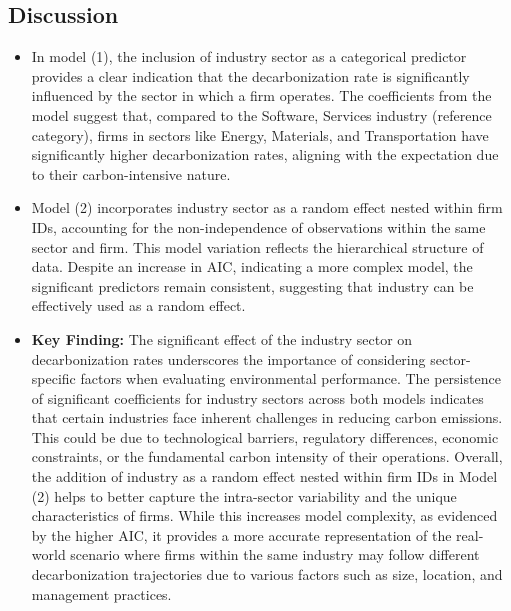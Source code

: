 \subsection{Discussion}
\begin{itemize}
    \item In model (1), the inclusion of industry sector as a categorical predictor provides a clear indication that the decarbonization rate is significantly influenced by the sector in which a firm operates. The coefficients from the model suggest that, compared to the Software, Services industry (reference category), firms in sectors like Energy, Materials, and Transportation have significantly higher decarbonization rates, aligning with the expectation due to their carbon-intensive nature.
    \item Model (2) incorporates industry sector as a random effect nested within firm IDs, accounting for the non-independence of observations within the same sector and firm. This model variation reflects the hierarchical structure of data. Despite an increase in AIC, indicating a more complex model, the significant predictors remain consistent, suggesting that industry can be effectively used as a random effect.
    \item \textbf{Key Finding:} The significant effect of the industry sector on decarbonization rates underscores the importance of considering sector-specific factors when evaluating environmental performance. The persistence of significant coefficients for industry sectors across both models indicates that certain industries face inherent challenges in reducing carbon emissions. This could be due to technological barriers, regulatory differences, economic constraints, or the fundamental carbon intensity of their operations. Overall, the addition of industry as a random effect nested within firm IDs in Model (2) helps to better capture the intra-sector variability and the unique characteristics of firms. While this increases model complexity, as evidenced by the higher AIC, it provides a more accurate representation of the real-world scenario where firms within the same industry may follow different decarbonization trajectories due to various factors such as size, location, and management practices.
    
\end{itemize}


